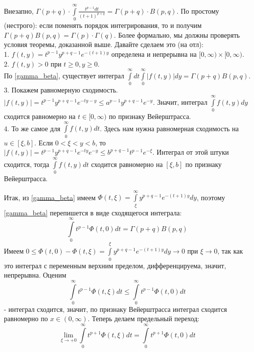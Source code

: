 Внезапно, 
$\Gamma(p+q)\cdot \int\limits_{0}^{\infty} \frac{t^{p-1}dt}{(t+1)^{p+q}}=
\Gamma(p+q)\cdot B(p,q)$. По простому (нестрого): если поменять 
порядок интегрирования, то и получим $\Gamma(p+q)B(p,q)=
\Gamma(p)\cdot \Gamma(q)$. Более формально, мы должны проверять условия 
теоремы, доказанной выше. Давайте сделаем это (на отл):\\
1. $f(t,y)=t^{p-1}y^{p+q-1}e^{-(t+1)y}$ определена и непрерывна на 
$[0,\infty)\times [0,\infty)$.\\
2. $f(t,y)>0$ при  $t\geqslant 0,y\geqslant 0$.\\
По \ref{gamma_beta}, существует интеграл $\int\limits_{0}^{\infty}
dt \int\limits_{0}^{\infty}|f(t,y)|dy=\Gamma(p+q)B(p,q)$.
3. Покажем равномерную сходимость. $|f(t,y)|=t^{p-1}y^{p+q-1}
e^{-ty-y}\leqslant a^{p-1}y^{p+q-1}e^{-y}$. Значит, интеграл 
$\int\limits_{0}^{\infty}f(t,y)dy$ сходится равномерно на $t\in [0,\infty)$
по признаку Вейерштрасса. \\
4. То же самое для $\int\limits_{0}^{\infty}f(t,y)dt$. Здесь
нам нужна равномерная сходимость на $u\in [\xi,b]$. Если 
$0<\xi<y<b$, то  $|f(t,y)|=t^{p-1}y^{p+q-1}e^{-ty}e^{-y}\leqslant 
b^{p+q-1}t^{p-1}e^{-\xi}$. Интеграл от этой штуки сходится, тогда
$\int\limits_{0}^{\infty}f(t,y)dt$ сходится равномерно на $[\xi,b]$ по 
признаку Вейерштрасса. 

Итак, из \ref{gamma_beta} имеем  $\Phi(t,\xi)=\int\limits_{\xi}^{\infty} 
y^{p+q-1}e^{-(t+1)y}dy$, поэтому \ref{gamma_beta} перепишется в виде
сходящегося интеграла:
$$\int\limits_{0}^{\infty}t^{p-1}\Phi(t,0)dt=\Gamma(p+q)B(p,q)$$ 
Имеем $0\leqslant \Phi(t,0)-\Phi(t,\xi)=
\int\limits_{0}^{\xi}y^{p+q-1}e^{-(t+1)y}dy\to 0$ при $\xi\to 0$,
так как это интеграл с переменным верхним пределом, дифференцируема, 
значит, непрерывна. Оценим
$$\int\limits_{0}^{\infty}t^{p-1}\Phi(t,\xi)dt\leqslant 
\int\limits_{0}^{\infty} t^{p-1}\Phi(t,0)dt$$
- интеграл сходится, значит, по признаку Вейерштрасса интеграл сходится
равномерно по $x \in (0,\infty)$. Теперь делаем предельный переход:
$$\lim\limits_{\xi \to +0}\int\limits_{0}^{\infty}t^{p+1}\Phi(t,\xi)dt
=\int\limits_{0}^{\infty}t^{p+1}\Phi(t,0)dt$$














